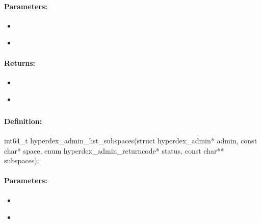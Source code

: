 \paragraph{Parameters:}
\begin{itemize}[noitemsep]
\item {}\\

\item {}\\

\end{itemize}

\paragraph{Returns:}
\begin{itemize}[noitemsep]
\item {}\\

\item {}\\

\end{itemize}

\pagebreak
\subsubsection{}
\label{api:c:list_subspaces}


\paragraph{Definition:}
\begin{ccode}
int64_t hyperdex_admin_list_subspaces(struct hyperdex_admin* admin,
        const char* space,
        enum hyperdex_admin_returncode* status,
        const char** subspaces);
\end{ccode}

\paragraph{Parameters:}
\begin{itemize}[noitemsep]
\item {}\\

\item {}\\

\end{itemize}

